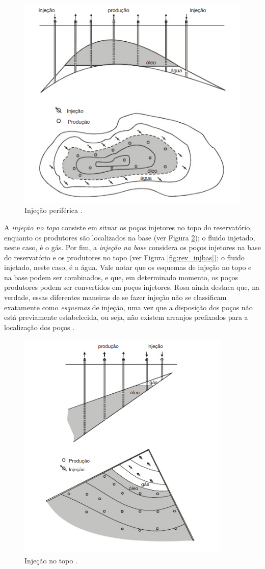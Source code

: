 \begin{figure}[!ht]
	\centering
	\includegraphics[width=.6\textwidth]{figs/revisao/revisao_injper.png}
	\caption{Inje\c{c}\~{a}o perif\'{e}rica \cite[p. 565]{engres}.}
	\label{fig:rev_injper}
\end{figure}

A \textit{inje\c{c}\~{a}o no topo} consiste em situar os po\c{c}os injetores no topo do reservat\'{o}rio, enquanto os produtores s\~{a}o localizados na base (ver Figura \ref{fig:rev_injtop}); o fluido injetado, neste caso, \'{e} o g\'{a}s. Por fim, a \textit{inje\c{c}\~{a}o na base} considera os po\c{c}os injetores na base do reservat\'{o}rio e os produtores no topo (ver Figura \ref{fig:rev_injbas}); o fluido injetado, neste caso, \'{e} a \'{a}gua. Vale notar que os esquemas de inje\c{c}\~{a}o no topo e na base podem ser combinados, e que, em determinado momento, os po\c{c}os produtores podem ser convertidos em po\c{c}os injetores. Rosa ainda destaca que, na verdade, essas diferentes maneiras de se fazer inje\c{c}\~{a}o n\~{a}o se classificam exatamente como
\textit{esquemas} de inje\c{c}\~{a}o, uma vez que a disposi\c{c}\~{a}o dos po\c{c}os n\~{a}o est\'{a} previamente estabelecida, ou seja, n\~{a}o existem arranjos prefixados para a localiza\c{c}\~{a}o dos po\c{c}os \cite[p. 566]{engres}.

\begin{figure}[!ht]
\centering
\includegraphics[width=.6\textwidth]{figs/revisao/revisao_injtop.png}
\caption{Inje\c{c}\~{a}o no topo \cite[p. 566]{engres}.}
\label{fig:rev_injtop}
\end{figure}

